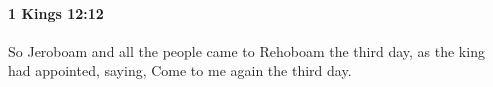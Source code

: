 
		\paragraph{1 Kings 12:12} %
			\label{1KINGS-12-12}

			So Jeroboam and all the people came to Rehoboam the third day, as the king had appointed, saying, Come to me again the third day.



